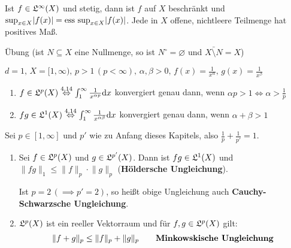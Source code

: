 \documentclass[a4paper,twoside,DIV15,BCOR12mm,chapterprefix=true,headings=onelinechapter]{scrbook}
\begin{document}
\begin{bemerkung}
Ist \(f\in\mathfrak{L}^{\infty}(X)\) und stetig, dann ist \(f\) auf \(X\) beschr\"ankt und \(\sup_{x\in X}\lvert f(x)\rvert=\text{ess sup}_{x\in X}\lvert f(x)\rvert\). Jede in \(X\) offene, nichtleere Teilmenge hat positives Ma\ss.
\end{bemerkung}
\begin{beweis}
\"Ubung (ist \(N\subseteq X\) eine Nullmenge, so ist \(N^{\circ}=\varnothing\) und \(\bar{X\setminus N}=X\))
\end{beweis}

\begin{beispiele}
\(d=1,\,X=[1,\infty),\,p>1\,(p<\infty),\,\alpha,\beta>0,\,f(x)=\frac{1}{x^{\alpha}},\,g(x)=\frac{1}{x^{\beta}}\)
\begin{enumerate}
\item \(f\in\mathfrak{L}^{p}(X)\overset{\text{4.14}}{\Leftrightarrow}\int_{1}^{\infty}{\frac{1}{x^{\alpha p}}\mathrm{d}x}\) 
konvergiert genau dann, wenn \(\alpha p>1\Leftrightarrow \alpha>\frac{1}{p}\)
\item \(fg\in\mathfrak{L}^{1}(X)\overset{\text{4.14}}{\Leftrightarrow}\int_{1}^{\infty}{\frac{1}{x^{\alpha\beta}}\mathrm{d}x}\)
konvergiert genau dann, wenn \(\alpha+\beta>1\)
\end{enumerate}
\end{beispiele}

\begin{satz}
\label{Satz 16.1}
Sei \(p\in[1,\infty]\) und \(p'\) wie zu Anfang dieses Kapitels, also \(\frac{1}{p}+\frac{1}{p'}=1\).
\begin{enumerate}
\item Sei \(f\in\mathfrak{L}^{p}(X)\) und \(g\in\mathfrak{L}^{p'}(X)\).
Dann ist \(fg\in\mathfrak{L}^{1}(X)\) und \(\lVert fg\rVert_{1}\leq\lVert f\rVert_{p}\cdot\lVert g\rVert_{p}\) (\textbf{H\"oldersche Ungleichung}).

Ist \(p=2\,(\implies p'=2)\), so hei\ss t obige Ungleichung auch \textbf{Cauchy-Schwarzsche Ungleichung}.
\item \(\mathfrak{L}^{p}(X)\) ist ein reeller Vektorraum und f\"ur \(f,g\in\mathfrak{L}^{p}(X)\) gilt:
\[
\lVert f+g\rVert_{p}\leq\lVert f\rVert_{p}+\lVert g\rVert_{p}\qquad\text{\textbf{Minkowskische Ungleichung}}
\]
\end{enumerate}
\end{satz}
\end{document}

